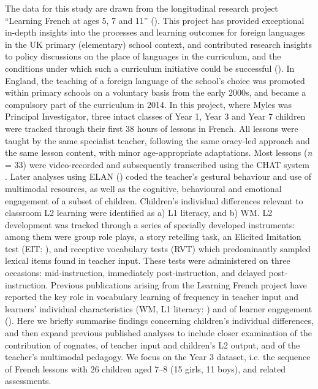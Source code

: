 \documentclass[output=paper]{langscibook}
\begin{document}
The data for this study are drawn from the longitudinal research project ``Learning French at ages 5, 7 and 11'' (\citealt{MylesEtAl2012,Myles2017}). This project has provided exceptional in-depth insights into the processes and learning outcomes for foreign languages in the UK primary (elementary) school context, and contributed research insights to policy discussions on the place of languages in the curriculum, and the conditions under which such a curriculum initiative could be successful (\citealt{HolmesMyles2019}). In England, the teaching of a foreign language of the school’s choice was promoted within primary schools on a voluntary basis from the early 2000s, and became a compulsory part of the curriculum in 2014. In this project, where Myles was Principal Investigator, three intact classes of Year 1, Year 3 and Year 7 children were tracked through their first 38 hours of lessons in French. All lessons were taught by the same specialist teacher, following the same oracy-led approach and the same lesson content, with minor age-appropriate adaptations. Most lessons (\textit{n} = 33) were video-recorded and subsequently transcribed using the CHAT system \citep{MacWhinney2000}. Later analyses using ELAN (\citealt{LausbergSloetjes2009}) coded the teacher’s gestural behaviour and use of multimodal resources, as well as the cognitive, behavioural and emotional engagement of a subset of children. Children’s individual differences relevant to classroom L2 learning were identified as a) L1 literacy, and b) WM. L2 development was tracked through a series of specially developed instruments: among them were group role plays, a story retelling task, an Elicited Imitation test (EIT: \citealt{Tracy-VenturaEtAl2014}), and receptive vocabulary tests (RVT) which predominantly sampled lexical items found in teacher input. These tests were administered on three occasions: mid-instruction, immediately post-instruction, and delayed post-instruction. Previous publications arising from the Learning French project have reported the key role in vocabulary learning of frequency in teacher input and learners’ individual characteristics (WM, L1 literacy: \citealt{MylesEtAl2012}) and of learner engagement (\citealt{MitchellRule2016,MitchellMyles2019}). Here we briefly summarise findings concerning children’s individual differences, and then expand previous published analyses to include closer examination of the contribution of cognates, of teacher input and children’s L2 output, and of the teacher’s multimodal pedagogy. We focus on the Year 3 dataset, i.e. the sequence of French lessons with 26 children aged 7--8 (15 girls, 11 boys), and related assessments.
\end{document}
